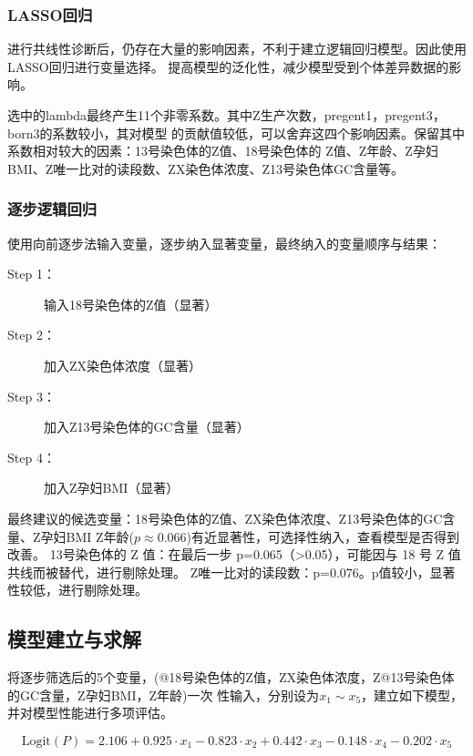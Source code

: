 \documentclass[withoutpreface,notoc]{cumcmthesis}
\begin{document}
	\subsubsection{LASSO回归}
	进行共线性诊断后，仍存在大量的影响因素，不利于建立逻辑回归模型。因此使用LASSO回归进行变量选择。
	提高模型的泛化性，减少模型受到个体差异数据的影响。




	选中的lambda最终产生11个非零系数。其中Z生产次数，pregent1，pregent3，born3的系数较小，其对模型
	的贡献值较低，可以舍弃这四个影响因素。保留其中系数相对较大的因素：13号染色体的Z值、18号染色体的
	Z值、Z年龄、Z孕妇BMI、Z唯一比对的读段数、ZX染色体浓度、Z13号染色体GC含量等。


	\subsubsection{逐步逻辑回归}
	使用向前逐步法输入变量，逐步纳入显著变量，最终纳入的变量顺序与结果：
	\begin{description}
		\item[Step 1：] 输入18号染色体的Z值（显著）
		\item[Step 2：] 加入ZX染色体浓度（显著）
		\item[Step 3：] 加入Z13号染色体的GC含量（显著）
		\item[Step 4：] 加入Z孕妇BMI（显著） 
	\end{description}


	最终建议的候选变量：18号染色体的Z值、ZX染色体浓度、Z13号染色体的GC含量、Z孕妇BMI
	Z年龄($ p \approx 0.066 $)有近显著性，可选择性纳入，查看模型是否得到改善。
	13号染色体的 Z 值：在最后一步 p=0.065（>0.05），可能因与 18 号 Z 值共线而被替代，进行剔除处理。
	Z唯一比对的读段数：p=0.076。p值较小，显著性较低，进行剔除处理。

	\subsection{模型建立与求解}

	将逐步筛选后的5个变量，(@18号染色体的Z值，ZX染色体浓度，Z@13号染色体的GC含量，Z孕妇BMI，Z年龄)一次
	性输入，分别设为$\displaystyle x_{1}\sim x_{5}$，建立如下模型，并对模型性能进行多项评估。

	\begin{equation*}
	\label{logit}
	\text{Logit}(P) = 2.106 + 0.925 \cdot x_{1} - 0.823 \cdot x_{2} + 0.442 \cdot x_{3} - 0.148 \cdot x_{4} - 0.202 \cdot x_{5}
	\end{equation*}
\end{document}
